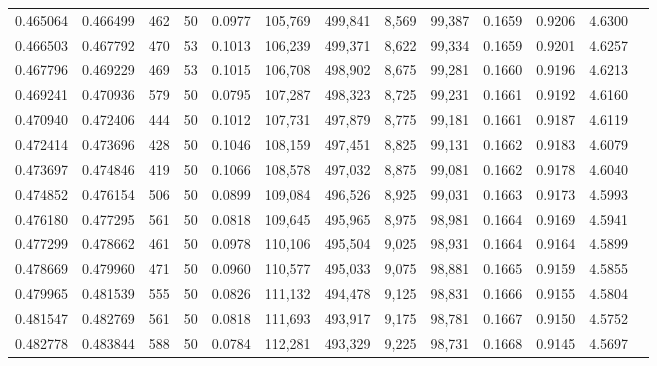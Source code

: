 \begin{tabular}{rrrrrrrrrrrrr}
0.465064 & 0.466499 &   462 &  50 &                                     0.0977 & 105,769 & 499,841 &   8,569 &  99,387 & 0.1659 & 0.9206 & 4.6300 \\
0.466503 & 0.467792 &   470 &  53 &                                     0.1013 & 106,239 & 499,371 &   8,622 &  99,334 & 0.1659 & 0.9201 & 4.6257 \\
0.467796 & 0.469229 &   469 &  53 &                                     0.1015 & 106,708 & 498,902 &   8,675 &  99,281 & 0.1660 & 0.9196 & 4.6213 \\
0.469241 & 0.470936 &   579 &  50 &                                     0.0795 & 107,287 & 498,323 &   8,725 &  99,231 & 0.1661 & 0.9192 & 4.6160 \\
0.470940 & 0.472406 &   444 &  50 &                                     0.1012 & 107,731 & 497,879 &   8,775 &  99,181 & 0.1661 & 0.9187 & 4.6119 \\
0.472414 & 0.473696 &   428 &  50 &                                     0.1046 & 108,159 & 497,451 &   8,825 &  99,131 & 0.1662 & 0.9183 & 4.6079 \\
0.473697 & 0.474846 &   419 &  50 &                                     0.1066 & 108,578 & 497,032 &   8,875 &  99,081 & 0.1662 & 0.9178 & 4.6040 \\
0.474852 & 0.476154 &   506 &  50 &                                     0.0899 & 109,084 & 496,526 &   8,925 &  99,031 & 0.1663 & 0.9173 & 4.5993 \\
0.476180 & 0.477295 &   561 &  50 &                                     0.0818 & 109,645 & 495,965 &   8,975 &  98,981 & 0.1664 & 0.9169 & 4.5941 \\
0.477299 & 0.478662 &   461 &  50 &                                     0.0978 & 110,106 & 495,504 &   9,025 &  98,931 & 0.1664 & 0.9164 & 4.5899 \\
0.478669 & 0.479960 &   471 &  50 &                                     0.0960 & 110,577 & 495,033 &   9,075 &  98,881 & 0.1665 & 0.9159 & 4.5855 \\
0.479965 & 0.481539 &   555 &  50 &                                     0.0826 & 111,132 & 494,478 &   9,125 &  98,831 & 0.1666 & 0.9155 & 4.5804 \\
0.481547 & 0.482769 &   561 &  50 &                                     0.0818 & 111,693 & 493,917 &   9,175 &  98,781 & 0.1667 & 0.9150 & 4.5752 \\
0.482778 & 0.483844 &   588 &  50 &                                     0.0784 & 112,281 & 493,329 &   9,225 &  98,731 & 0.1668 & 0.9145 & 4.5697 \\

\end{tabular}
